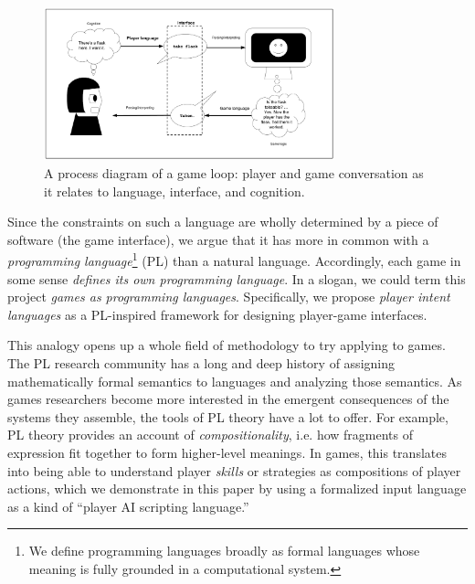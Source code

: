 \documentclass[sigconf]{acmart}
\begin{document}
\begin{figure}
\includegraphics[width=0.75\textwidth]{conversation-processing.png}
\caption{A process diagram of a game loop: player and game conversation as
it relates to language, interface, and cognition.}
\label{fig:gameloop}
\end{figure}

Since the constraints on such a language are wholly determined
by a piece of software (the game interface), we argue that it
has more in common with a {\em programming language}\footnote{We define
  programming languages broadly as formal languages whose meaning is fully
grounded in a computational system.} (PL) than a natural language.
Accordingly, each game in some sense {\em defines its own programming
language}. In a slogan, we could term this project {\em games as
programming languages}.
%
Specifically, we propose \emph{player intent languages} as a PL-inspired
framework for designing player-game interfaces.


This analogy opens up a whole field of methodology to try applying to
games.  The PL research community has a long and deep
history of assigning mathematically formal semantics to languages and
analyzing those semantics. As games researchers become more interested in
the emergent consequences of the systems they assemble, the tools of PL
theory have a lot to offer. For example, PL theory provides an account of
{\em compositionality}, i.e. how fragments of expression fit together to
form higher-level meanings. In games, this translates into being able to
understand player {\em skills} or strategies as compositions of player
actions, which we demonstrate in this paper by using a formalized input
language as a kind of ``player AI scripting language.''

\end{document}
